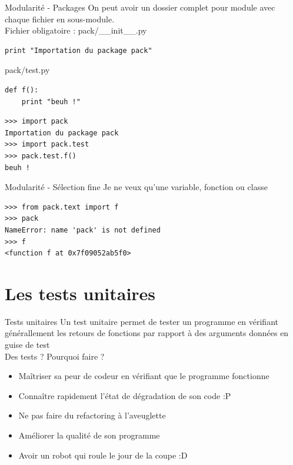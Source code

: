 \documentclass{beamer}
\begin{document}
\begin{frame}[fragile]{Modularité - Packages}
On peut avoir un dossier complet pour module avec chaque fichier en sous-module.\\
Fichier obligatoire : pack/\_\_init\_\_.py
\begin{lstlisting}
print "Importation du package pack"
\end{lstlisting}
pack/test.py
\begin{lstlisting}
def f():
    print "beuh !"
\end{lstlisting}
\begin{lstlisting}
>>> import pack
Importation du package pack
>>> import pack.test
>>> pack.test.f()
beuh !
\end{lstlisting}

\end{frame}

\begin{frame}[fragile]{Modularité - Sélection fine}
Je ne veux qu'une variable, fonction ou classe
\begin{lstlisting}
>>> from pack.text import f
>>> pack
NameError: name 'pack' is not defined
>>> f
<function f at 0x7f09052ab5f0>
\end{lstlisting}
\end{frame}



\section{Les tests unitaires}

\begin{frame}[fragile]{Tests unitaires}
Un test unitaire permet de tester un programme en vérifiant générallement les retours de fonctions par rapport à des arguments données en guise de test\\
Des tests ? Pourquoi faire ?
\begin{itemize}
 \item Maîtriser sa peur de codeur en vérifiant que le programme fonctionne
 \item Connaître rapidement l'état de dégradation de son code :P
 \item Ne pas faire du refactoring à l'aveuglette
 \item Améliorer la qualité de son programme
 \item Avoir un robot qui roule le jour de la coupe :D
\end{itemize}
\end{frame}
\end{document}
